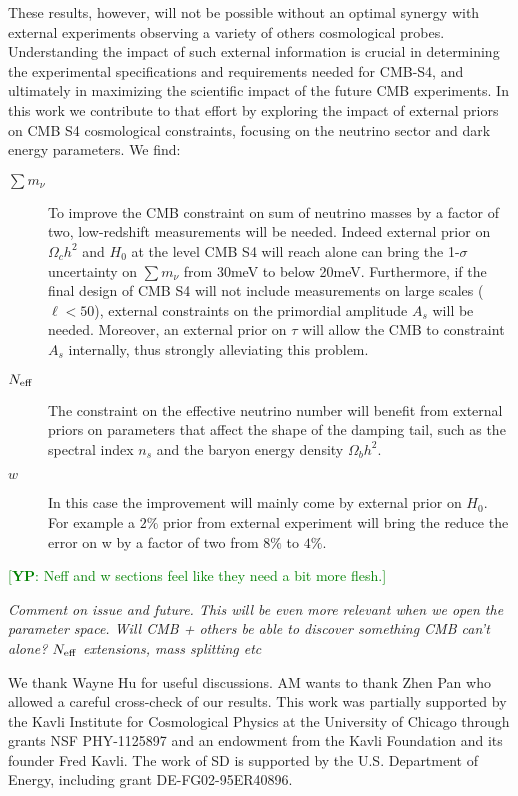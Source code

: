 \documentclass[aps,prd,reprint,superscriptaddress]{revtex4-1}
\newcommand{\yp}[1]{\textcolor{green}{[{\bf YP}: #1]}}
\begin{document}
These results, however, will not be possible without an optimal synergy with external experiments observing a variety of others cosmological probes.
Understanding the impact of such external information is crucial in determining the experimental specifications and requirements needed for CMB-S4, and ultimately in maximizing the scientific impact of the future CMB experiments. 
In this work we contribute to that effort by exploring the impact of external priors on CMB S4 cosmological constraints, focusing on the neutrino sector and dark energy parameters.
We find:
\begin{description}
\item[$\sum m_\nu$] To improve the CMB constraint on sum of neutrino masses by a factor of two, low-redshift measurements will be needed. Indeed external prior on $\Omega_{c}h^{2}$ and $H_{0}$ at the level CMB S4 will reach alone can bring the 1-$\sigma$ uncertainty on $\sum m_\nu$ from $30$meV to below 20meV.
Furthermore, if the final design of CMB S4 will not include measurements on large scales ($\ell<50$), external constraints on the primordial amplitude $A_{s}$ will be needed. Moreover, an external prior on $\tau$ will allow the CMB to constraint $A_{s}$ internally, thus strongly alleviating this problem.
\item[$N_{\rm eff}$] The constraint on the effective neutrino number will benefit from external priors on parameters that affect the shape of the damping tail, such as the spectral index $n_s$ and the baryon energy density $\Omega_b h^2$.
\item[$w$] In this case the improvement will mainly come by external prior on $H_{0}$. For example a $2\%$ prior from external experiment will bring the reduce the error on w by a factor of two from 8$\%$ to $4\%$. 
\end{description}
\yp{Neff and w sections feel like they need a bit more flesh.}

\textit{Comment on issue and future. This will be even more relevant when we open the parameter space. Will CMB + others be able to discover something CMB can't alone? $N_{\rm eff}$ extensions, mass splitting etc}





\begin{acknowledgments}
We thank Wayne Hu for useful discussions. AM wants to thank Zhen Pan who allowed a careful cross-check of our results.
This work was partially supported by the Kavli Institute for Cosmological Physics at the University of Chicago through grants NSF PHY-1125897 and an endowment from the Kavli Foundation and its founder Fred Kavli.
The work of SD is supported by the U.S. Department of Energy, including grant DE-FG02-95ER40896.
\end{acknowledgments}


\end{document}
